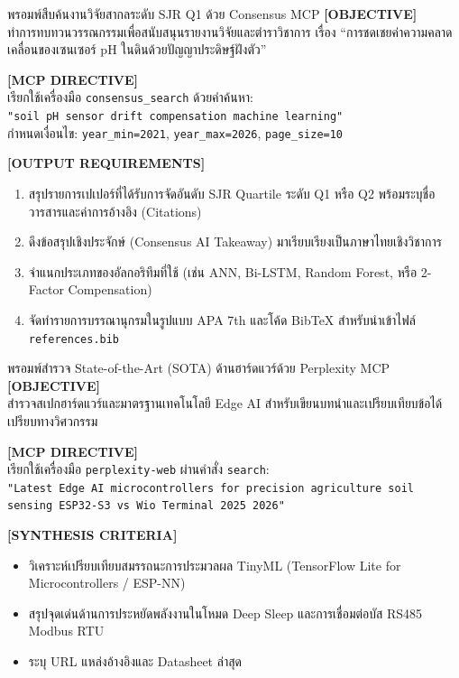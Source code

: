 \begin{promptbox}{พรอมพ์สืบค้นงานวิจัยสากลระดับ SJR Q1 ด้วย Consensus MCP}
\small
\textbf{[OBJECTIVE]}\\
ทำการทบทวนวรรณกรรมเพื่อสนับสนุนรายงานวิจัยและตำราวิชาการ เรื่อง ``การชดเชยค่าความคลาดเคลื่อนของเซนเซอร์ pH ในดินด้วยปัญญาประดิษฐ์ฝังตัว''

\vspace{4pt}
\textbf{[MCP DIRECTIVE]}\\
เรียกใช้เครื่องมือ \texttt{consensus\_search} ด้วยคำค้นหา:\\
\texttt{"soil pH sensor drift compensation machine learning"} \\
กำหนดเงื่อนไข: \texttt{year\_min=2021}, \texttt{year\_max=2026}, \texttt{page\_size=10}

\vspace{4pt}
\textbf{[OUTPUT REQUIREMENTS]}
\begin{enumerate}[leftmargin=15pt, itemsep=1pt]
    \item สรุปรายการเปเปอร์ที่ได้รับการจัดอันดับ SJR Quartile ระดับ Q1 หรือ Q2 พร้อมระบุชื่อวารสารและค่าการอ้างอิง (Citations)
    \item ดึงข้อสรุปเชิงประจักษ์ (Consensus AI Takeaway) มาเรียบเรียงเป็นภาษาไทยเชิงวิชาการ
    \item จำแนกประเภทของอัลกอริทึมที่ใช้ (เช่น ANN, Bi-LSTM, Random Forest, หรือ 2-Factor Compensation)
    \item จัดทำรายการบรรณานุกรมในรูปแบบ APA 7th และโค้ด BibTeX สำหรับนำเข้าไฟล์ \texttt{references.bib}
\end{enumerate}
\end{promptbox}
\label{box:prompt_consensus}

\begin{promptbox}{พรอมพ์สำรวจ State-of-the-Art (SOTA) ด้านฮาร์ดแวร์ด้วย Perplexity MCP}
\small
\textbf{[OBJECTIVE]}\\
สำรวจสเปกฮาร์ดแวร์และมาตรฐานเทคโนโลยี Edge AI สำหรับเขียนบทนำและเปรียบเทียบข้อได้เปรียบทางวิศวกรรม

\vspace{4pt}
\textbf{[MCP DIRECTIVE]}\\
เรียกใช้เครื่องมือ \texttt{perplexity-web} ผ่านคำสั่ง \texttt{search}:\\
\texttt{"Latest Edge AI microcontrollers for precision agriculture soil sensing ESP32-S3 vs Wio Terminal 2025 2026"}

\vspace{4pt}
\textbf{[SYNTHESIS CRITERIA]}
\begin{itemize}[leftmargin=15pt, itemsep=1pt]
    \item วิเคราะห์เปรียบเทียบสมรรถนะการประมวลผล TinyML (TensorFlow Lite for Microcontrollers / ESP-NN)
    \item สรุปจุดเด่นด้านการประหยัดพลังงานในโหมด Deep Sleep และการเชื่อมต่อบัส RS485 Modbus RTU
    \item ระบุ URL แหล่งอ้างอิงและ Datasheet ล่าสุด
\end{itemize}
\end{promptbox}
\label{box:prompt_perplexity}

